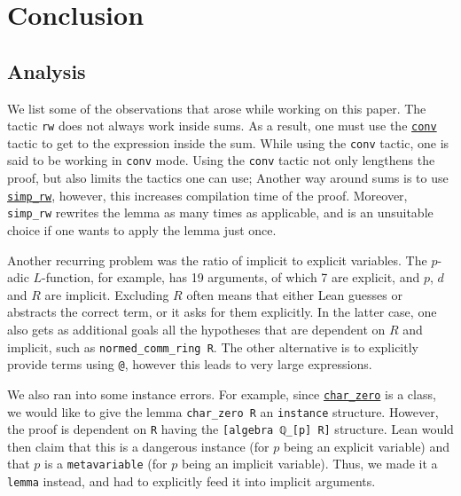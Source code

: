 \documentclass[a4paper,UKenglish,cleveref, autoref, thm-restate,pdfa]{lipics-v2021}
\newcommand{\lean}[1]{\texttt{#1}\xspace} %
\begin{document}
\section{Conclusion}
\label{section5}
\subsection{Analysis}
We list some of the observations that arose while working on this paper. 
\newline
The tactic \lean{rw} does not always work inside sums. As a result, one must use 
the \href{https://leanprover-community.github.io/extras/conv.html}{\lean{conv}} tactic to get to the expression inside the sum. While using the \lean{conv} tactic, one is said to be working 
in \lean{conv} mode. Using the \lean{conv} tactic not only lengthens the proof, but also limits the tactics one can use; 
Another way around sums is to use \href{https://leanprover-community.github.io/mathlib_docs/tactics.html#simp_rw}{\lean{simp\_rw}}, 
however, this increases compilation time of the proof. Moreover, \lean{simp\_rw} rewrites the lemma as many times as applicable, and is an unsuitable choice if one wants to apply 
the lemma just once. 

Another recurring problem was the ratio of implicit to explicit variables. The $p$-adic $L$-function, for example, has 19 arguments, of which 7 are explicit, and $p$, 
$d$ and $R$ are implicit. Excluding $R$ often means that either Lean guesses or abstracts the correct term, 
or it asks for them explicitly. In the latter case, one also gets as additional goals all the hypotheses that are dependent on $R$ and implicit, such as \lean{normed\_comm\_ring R}. 
The other alternative is to explicitly provide terms using \lean{@}, however this leads to very large expressions. 

We also ran into some instance errors. For example, since \href{https://leanprover-community.github.io/mathlib_docs/algebra/char_zero/defs.html#char_zero}{\lean{char\_zero}} 
is a class, we would like to give the lemma \lean{char\_zero R} an \lean{instance} structure. 
However, the proof is dependent on \lean{R} having the \lean{[algebra ℚ\_[p] R]} structure. Lean would then claim that this is a dangerous instance 
(for $p$ being an explicit variable) and that $p$ is a \lean{metavariable} (for $p$ being an implicit variable). Thus, we made it a \lean{lemma} instead, and had to explicitly 
feed it into implicit arguments.
\end{document}
